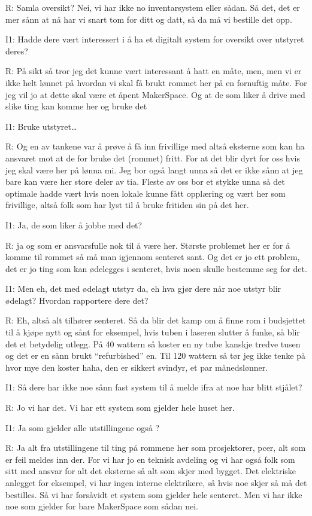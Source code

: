 R: Samla oversikt? Nei, vi har ikke no inventarsystem eller sådan.  Så det, det er mer sånn at  nå har vi snart tom for ditt og datt, så da må vi bestille det opp. 

I1: Hadde dere vært interessert i å ha et digitalt system for oversikt over utstyret deres?  

R: På sikt så tror jeg det kunne vært interessant å hatt en måte, men, men vi er ikke helt lønnet på hvordan vi skal få brukt rommet her på en fornuftig måte. For jeg vil jo at dette skal være et åpent MakerSpace.  Og at de som liker å drive med slike ting kan komme her og bruke det

I1: Bruke utstyret…

R: Og en av tankene var å prøve å få inn frivillige med altså eksterne som kan ha ansvaret  mot at de for bruke det (rommet) fritt. For at det blir dyrt for oss hvis jeg skal være her på lønna mi. Jeg bor også langt unna så  det er ikke sånn at jeg bare kan være her store deler av tia. Fleste av oss bor et stykke unna så det optimale hadde vært hvis noen lokale kunne fått opplæring og vært her som frivillige, altså folk som har lyst til å bruke fritiden sin på det her.

I1: Ja, de som liker å jobbe med det?     

R: ja og som er ansvarsfulle nok til å være her. Største problemet her er for å komme til rommet så må man igjennom senteret sant. Og det er jo ett problem, det er jo ting som kan ødelegges i senteret, hvis noen skulle bestemme seg for det. 

I1: Men eh, det med ødelagt utstyr da, eh hva gjør dere når noe utstyr blir ødelagt? Hvordan rapportere dere det? 

R: Eh, altså alt tilhører senteret. Så da blir det kamp om å finne rom  i budsjettet til å kjøpe nytt og sånt  for eksempel, hvis tuben i laseren slutter å funke, så blir det et betydelig utlegg. På 40 wattern så koster en ny tube kanskje tredve tusen  og det er en sånn brukt “refurbished” en. Til 120 wattern så tør jeg ikke tenke på hvor mye den koster haha, den er sikkert svindyr, et par månedslønner.

I1: Så dere har ikke noe sånn  fast system til å melde ifra at noe har blitt stjålet?

R: Jo vi har det. Vi har ett system som  gjelder hele huset her.

I1: Ja som gjelder alle utstillingene også ?

R: Ja alt fra utstillingene til ting på rommene her som prosjektorer, pcer, alt som er feil meldes inn der. For vi har jo en teknisk avdeling og vi har også folk som sitt med ansvar for alt det eksterne så alt som skjer med bygget. Det elektriske anlegget for eksempel, vi har ingen interne elektrikere, så hvis noe skjer så må det bestilles. Så vi har forsåvidt et system som gjelder hele senteret. Men vi har ikke noe som gjelder for bare MakerSpace som sådan nei.

